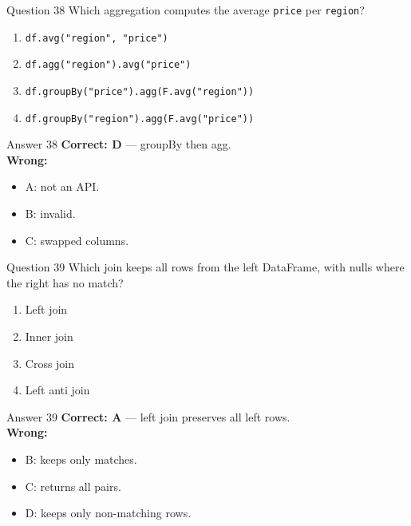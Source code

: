 \documentclass[aspectratio=169,11pt]{beamer}
\begin{document}
\begin{frame}{Question 38}
Which aggregation computes the average \texttt{price} per \texttt{region}?
\begin{enumerate}[label=\Alph*.]
\item \texttt{df.avg("region", "price")}
\item \texttt{df.agg("region").avg("price")}
\item \texttt{df.groupBy("price").agg(F.avg("region"))}
\item \texttt{df.groupBy("region").agg(F.avg("price"))}
\end{enumerate}
\end{frame}
\begin{frame}{Answer 38}
\textbf{Correct: D} --- groupBy then agg.\\
\vspace{0.5em}
\textbf{Wrong:}
\begin{itemize}
\item A: not an API.
\item B: invalid.
\item C: swapped columns.
\end{itemize}
\end{frame}

\begin{frame}{Question 39}
Which join keeps all rows from the left DataFrame, with nulls where the right has no match?
\begin{enumerate}[label=\Alph*.]
\item Left join
\item Inner join
\item Cross join
\item Left anti join
\end{enumerate}
\end{frame}
\begin{frame}{Answer 39}
\textbf{Correct: A} --- left join preserves all left rows.\\
\vspace{0.5em}
\textbf{Wrong:}
\begin{itemize}
\item B: keeps only matches.
\item C: returns all pairs.
\item D: keeps only non-matching rows.
\end{itemize}
\end{frame}
\end{document}
